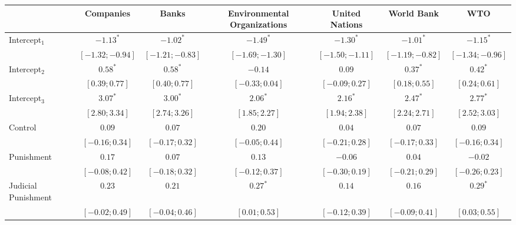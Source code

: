 \usepackage{threeparttable}

\begin{table}
\begin{center}
\begin{threeparttable}
\begin{tabular}{l c c c c c c}
\hline
 & Companies & Banks & Environmental Organizations & United Nations & World Bank & WTO \\
\hline
Intercept$_1$       & $-1.13^{*}$       & $-1.02^{*}$       & $-1.49^{*}$       & $-1.30^{*}$       & $-1.01^{*}$       & $-1.15^{*}$       \\
                    & $ [-1.32; -0.94]$ & $ [-1.21; -0.83]$ & $ [-1.69; -1.30]$ & $ [-1.50; -1.11]$ & $ [-1.19; -0.82]$ & $ [-1.34; -0.96]$ \\
Intercept$_2$       & $0.58^{*}$        & $0.58^{*}$        & $-0.14$           & $0.09$            & $0.37^{*}$        & $0.42^{*}$        \\
                    & $ [ 0.39;  0.77]$ & $ [ 0.40;  0.77]$ & $ [-0.33;  0.04]$ & $ [-0.09;  0.27]$ & $ [ 0.18;  0.55]$ & $ [ 0.24;  0.61]$ \\
Intercept$_3$       & $3.07^{*}$        & $3.00^{*}$        & $2.06^{*}$        & $2.16^{*}$        & $2.47^{*}$        & $2.77^{*}$        \\
                    & $ [ 2.80;  3.34]$ & $ [ 2.74;  3.26]$ & $ [ 1.85;  2.27]$ & $ [ 1.94;  2.38]$ & $ [ 2.24;  2.71]$ & $ [ 2.52;  3.03]$ \\
Control             & $0.09$            & $0.07$            & $0.20$            & $0.04$            & $0.07$            & $0.09$            \\
                    & $ [-0.16;  0.34]$ & $ [-0.17;  0.32]$ & $ [-0.05;  0.44]$ & $ [-0.21;  0.28]$ & $ [-0.17;  0.33]$ & $ [-0.16;  0.34]$ \\
Punishment          & $0.17$            & $0.07$            & $0.13$            & $-0.06$           & $0.04$            & $-0.02$           \\
                    & $ [-0.08;  0.42]$ & $ [-0.18;  0.32]$ & $ [-0.12;  0.37]$ & $ [-0.30;  0.19]$ & $ [-0.21;  0.29]$ & $ [-0.26;  0.23]$ \\
Judicial Punishment & $0.23$            & $0.21$            & $0.27^{*}$        & $0.14$            & $0.16$            & $0.29^{*}$        \\
                    & $ [-0.02;  0.49]$ & $ [-0.04;  0.46]$ & $ [ 0.01;  0.53]$ & $ [-0.12;  0.39]$ & $ [-0.09;  0.41]$ & $ [ 0.03;  0.55]$ \\

\end{tabular}
\end{threeparttable}
\end{center}
\end{table}
